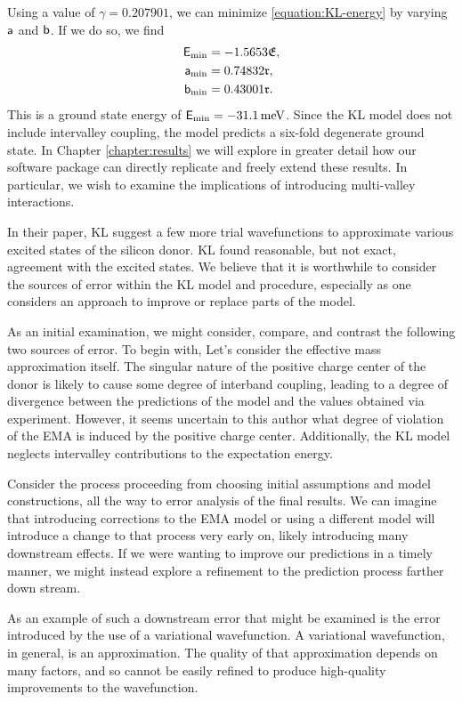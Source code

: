 Using a value of $\gamma = 0.207901$, we can minimize \eqref{equation:KL-energy}
by varying $\mathsf{a}$ and $\mathsf{b}$. If we do so, we find
\begin{align}
    \mathsf{E}_{\text{min}} &= -1.5653\mathfrak{E},\\
    \mathsf{a}_{\text{min}} &= 0.74832\mathfrak{r},\\
    \mathsf{b}_{\text{min}} &= 0.43001\mathfrak{r}.
\end{align}
This is a ground state energy of $\real{E}_{\text{min}} = \SI{-31.1}{\meV}$.
Since the KL model does not include intervalley coupling, the model predicts a
six-fold degenerate ground state. In Chapter \ref{chapter:results} we will
explore in greater detail how our software package can directly replicate and
freely extend these results. In particular, we wish to examine the implications
of introducing multi-valley interactions.

In their paper, KL suggest a few more trial wavefunctions to approximate various
excited states of the silicon donor. KL found reasonable, but not exact,
agreement with the excited states. We believe that it is worthwhile to consider
the sources of error within the KL model and procedure, especially as one
considers an approach to improve or replace parts of the model.

As an initial examination, we might consider, compare, and contrast the
following two sources of error. To begin with, Let's consider the effective mass
approximation itself. The singular nature of the positive charge center of the
donor is likely to cause some degree of interband coupling, leading to a degree
of divergence between the predictions of the model and the values obtained via
experiment. However, it seems uncertain to this author what degree of violation
of the EMA is induced by the positive charge center. Additionally, the KL model
neglects intervalley contributions to the expectation energy.

Consider the process proceeding from choosing initial assumptions and model
constructions, all the way to error analysis of the final results. We can
imagine that introducing corrections to the EMA model or using a different model
will introduce a change to that process very early on, likely introducing many
downstream effects. If we were wanting to improve our predictions in a timely
manner, we might instead explore a refinement to the prediction process farther
down stream.

As an example of such a downstream error that might be examined is the error
introduced by the use of a variational wavefunction. A variational wavefunction,
in general, is an approximation. The quality of that approximation depends on
many factors, and so cannot be easily refined to produce high-quality
improvements to the wavefunction.

